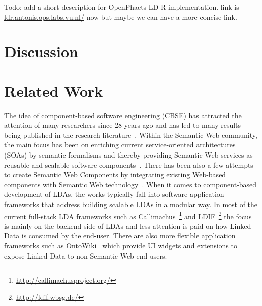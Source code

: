 \documentclass{acm_proc_article-sp}
\begin{document}
Todo: add a short description for OpenPhacts LD-R implementation.
link is \url{ldr.antonis.ops.labs.vu.nl/} now but maybe we can have a more concise link.

\section{Discussion}

\section{Related Work}
The idea of component-based software engineering (CBSE) has attracted the attention of many researchers since 28 years ago and has led to many results being published in the research literature~\cite{Vale2015}.
Within the Semantic Web community, the main focus has been on enriching current service-oriented architectures (SOAs) by semantic formalisms and thereby providing Semantic Web services as reusable and scalable software components~\cite{sws2015}.
There has been also a few attempts to create Semantic Web Components by integrating existing Web-based components with Semantic Web technology~\cite{pahl2011}.
When it comes to component-based development of LDAs, the works typically fall into 
software application frameworks that address building scalable LDAs in a modular way.
In most of the current full-stack LDA frameworks such as Callimachus~\footnote{\url{http://callimachusproject.org/}} and LDIF~\footnote{\url{http://ldif.wbsg.de/}} the focus is mainly on the backend side of LDAs and less attention is paid on how Linked Data is consumed by the end-user. 
There are also more flexible application frameworks such as OntoWiki~\cite{ontowiki-swj} which provide UI widgets and extensions to expose Linked Data to non-Semantic Web end-users.
\end{document}
